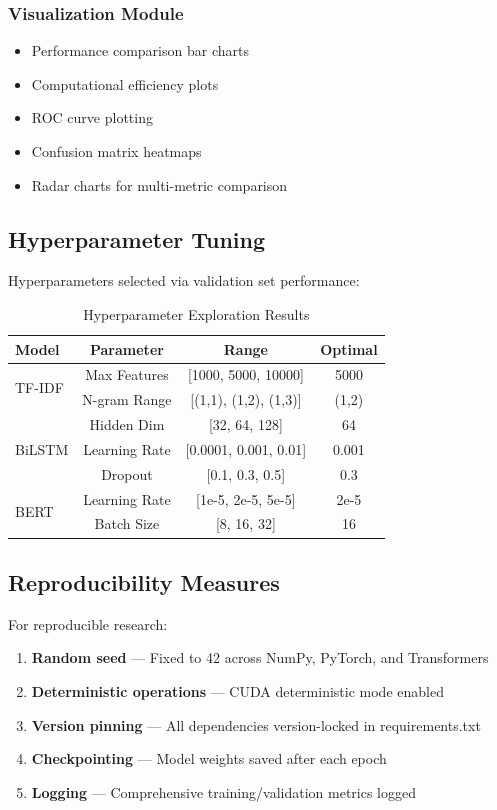 \subsubsection{Visualization Module}

\begin{itemize}
  \item Performance comparison bar charts
  \item Computational efficiency plots
  \item ROC curve plotting
  \item Confusion matrix heatmaps
  \item Radar charts for multi-metric comparison
\end{itemize}

\subsection{Hyperparameter Tuning}

Hyperparameters selected via validation set performance:

\begin{table}[h!]
\centering
\caption{Hyperparameter Exploration Results}
\label{tab:hyperparams}
\begin{tabular}{|l|c|c|c|}
\hline
\textbf{Model} & \textbf{Parameter} & \textbf{Range} & \textbf{Optimal} \\
\hline
\multirow{2}{*}{TF-IDF} & Max Features & [1000, 5000, 10000] & 5000 \\
& N-gram Range & [(1,1), (1,2), (1,3)] & (1,2) \\
\hline
\multirow{3}{*}{BiLSTM} & Hidden Dim & [32, 64, 128] & 64 \\
& Learning Rate & [0.0001, 0.001, 0.01] & 0.001 \\
& Dropout & [0.1, 0.3, 0.5] & 0.3 \\
\hline
\multirow{2}{*}{BERT} & Learning Rate & [1e-5, 2e-5, 5e-5] & 2e-5 \\
& Batch Size & [8, 16, 32] & 16 \\
\hline
\end{tabular}
\end{table}

\subsection{Reproducibility Measures}

For reproducible research:

\begin{enumerate}
  \item \textbf{Random seed} --- Fixed to 42 across NumPy, PyTorch, and Transformers
  \item \textbf{Deterministic operations} --- CUDA deterministic mode enabled
  \item \textbf{Version pinning} --- All dependencies version-locked in requirements.txt
  \item \textbf{Checkpointing} --- Model weights saved after each epoch
  \item \textbf{Logging} --- Comprehensive training/validation metrics logged
\end{enumerate}

